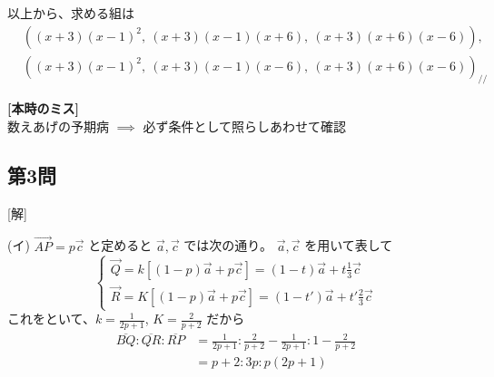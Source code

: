 \documentclass[../main.tex]{subfiles}
\begin{document}
以上から、求める組は
\[
  \begin{aligned}
    &\left( (x+3)(x-1)^2, \ (x+3)(x-1)(x+6), \ (x+3)(x+6)(x-6) \right), \\
    &\left( (x+3)(x-1)^2, \ (x+3)(x-1)(x-6), \ (x+3)(x+6)(x-6) \right)_{\mathbin{/\!/}}
  \end{aligned}
\]

\noindent
\textbf{[本時のミス]}\\
数えあげの予期病 $\implies$ 必ず条件として照らしあわせて確認

\subsection*{第3問}

[解]
\begin{center}
\end{center}

(イ) $\vec{AP} = p \vec{c}$ と定めると $\vec{a}, \vec{c}$ では次の通り。
$\vec{a}, \vec{c}$ を用いて表して
\[
  \begin{cases}
    \vec{Q} = k [(1-p)\vec{a} + p\vec{c}] = (1-t)\vec{a} + t \frac{1}{3}\vec{c} \\
    \vec{R} = K [(1-p)\vec{a} + p\vec{c}] = (1-t')\vec{a} + t' \frac{2}{3}\vec{c}
  \end{cases}
\]
これをといて、$k = \frac{1}{2p+1}$, $K = \frac{2}{p+2}$ だから
\[
  \begin{aligned}
    \overline{BQ} : \overline{QR} : \overline{RP} &= \frac{1}{2p+1} : \frac{2}{p+2} - \frac{1}{2p+1} : 1 - \frac{2}{p+2} \\
    &= p+2 : 3p : p(2p+1)
  \end{aligned}
\]
\end{document}
